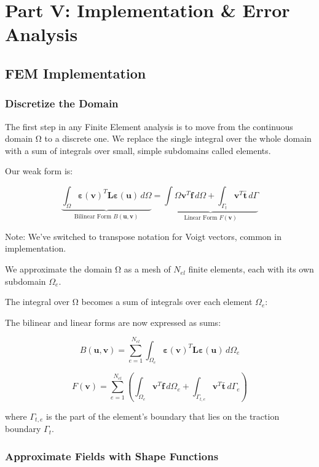 \documentclass[
  11pt,
  a4paper,
]{scrbook}
\begin{document}
\part{Part V: Implementation \& Error Analysis}

\chapter{FEM Implementation}\label{fem-implementation}

\section{Discretize the Domain}\label{discretize-the-domain}

The first step in any Finite Element analysis is to move from the
continuous domain Ω to a discrete one. We replace the single integral
over the whole domain with a sum of integrals over small, simple
subdomains called elements.

Our weak form is:

\[\underbrace{\int_{\Omega} \boldsymbol{\varepsilon}(\mathbf{v})^T \mathbf{L} \boldsymbol{\varepsilon}(\mathbf{u}) \, d\Omega}_{\text{Bilinear Form } B(\mathbf{u},\mathbf{v})} = \underbrace{\int{\Omega} \mathbf{v}^T \mathbf{f} \, d\Omega + \int_{\Gamma_t} \mathbf{v}^T \bar{\mathbf{t}} \, d\Gamma}_{\text{Linear Form } F(\mathbf{v})}\]

Note: We've switched to transpose notation for Voigt vectors, common in
implementation.

We approximate the domain Ω as a mesh of \(N_{el}\) finite elements,
each with its own subdomain \(\Omega_e\).

The integral over Ω becomes a sum of integrals over each element
\(\Omega_e\):

The bilinear and linear forms are now expressed as sums:

\[B(\mathbf{u},\mathbf{v}) = \sum_{e=1}^{N_{el}} \int_{\Omega_e} \boldsymbol{\varepsilon}(\mathbf{v})^T \mathbf{L} \boldsymbol{\varepsilon}(\mathbf{u}) \, d\Omega_e\]

\[F(\mathbf{v}) = \sum_{e=1}^{N_{el}} \left( \int_{\Omega_e} \mathbf{v}^T \mathbf{f} \, d\Omega_e + \int_{\Gamma_{t,e}} \mathbf{v}^T \bar{\mathbf{t}} \, d\Gamma_e \right)\]

where \(\Gamma_{t,e}\) is the part of the element's boundary that lies
on the traction boundary \(\Gamma_t\).

\section{Approximate Fields with Shape
Functions}\label{approximate-fields-with-shape-functions}
\end{document}
